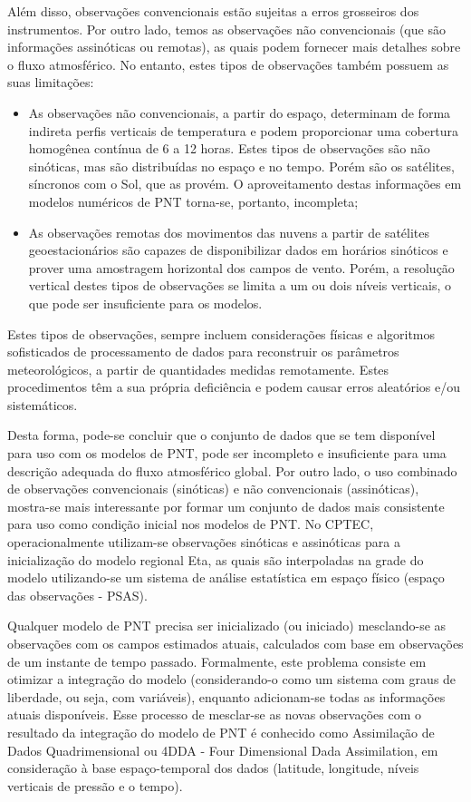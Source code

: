 Além disso, observações convencionais estão sujeitas a erros grosseiros dos instrumentos. Por outro lado, temos as observações não convencionais (que são informações assinóticas ou remotas), as quais podem fornecer mais detalhes sobre o fluxo atmosférico. No entanto, estes tipos de observações também possuem as suas limitações:

\begin{itemize}
\item As observações não convencionais, a partir do espaço, determinam de forma indireta perfis verticais de temperatura e podem proporcionar uma cobertura homogênea contínua de 6 a 12 horas. Estes tipos de observações são não sinóticas, mas são distribuídas no espaço e no tempo. Porém são os satélites, síncronos com o Sol, que as provém. O aproveitamento destas informações em modelos numéricos de PNT torna-se, portanto, incompleta;
\item As observações remotas dos movimentos das nuvens a partir de satélites geoestacionários são capazes de disponibilizar dados em horários sinóticos e prover uma amostragem horizontal dos campos de vento. Porém, a resolução vertical destes tipos de observações se limita a um ou dois níveis verticais, o que pode ser insuficiente para os modelos.
\end{itemize}

Estes tipos de observações, sempre incluem considerações físicas e algoritmos sofisticados de processamento de dados para reconstruir os parâmetros meteorológicos, a partir de quantidades medidas remotamente. Estes procedimentos têm a sua própria deficiência e podem causar erros aleatórios e/ou sistemáticos.

Desta forma, pode-se concluir que o conjunto de dados que se tem disponível para uso com os modelos de PNT, pode ser incompleto e insuficiente para uma descrição adequada do fluxo atmosférico global. Por outro lado, o uso combinado de observações convencionais (sinóticas) e não convencionais (assinóticas), mostra-se mais interessante por formar um conjunto de dados mais consistente para uso como condição inicial nos modelos de PNT. No CPTEC, operacionalmente utilizam-se observações sinóticas e assinóticas para a inicialização do modelo regional Eta, as quais são interpoladas na grade do modelo utilizando-se um sistema de análise estatística em espaço físico (espaço das observações - PSAS).

Qualquer modelo de PNT precisa ser inicializado (ou iniciado) mesclando-se as observações com os campos estimados atuais, calculados com base em observações de um instante de tempo passado. Formalmente, este problema consiste em otimizar a integração do modelo (considerando-o como um sistema com  graus de liberdade, ou seja, com  variáveis), enquanto adicionam-se todas as informações atuais disponíveis. Esse processo de mesclar-se as novas observações com o resultado da integração do modelo de PNT é conhecido como Assimilação de Dados Quadrimensional ou 4DDA - Four Dimensional Dada Assimilation, em consideração à base espaço-temporal dos dados (latitude, longitude, níveis verticais de pressão e o tempo).

